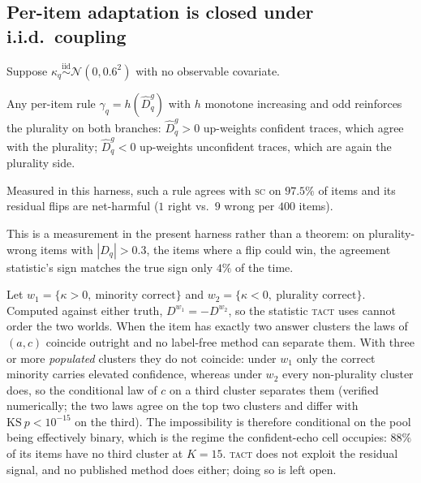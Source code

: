 \documentclass[twoside,11pt]{article}
\newcommand{\Dhat}{\widehat{D}}
\newcommand{\SC}{\textsc{sc}}
\newcommand{\TACT}{\textsc{tact}}
\begin{document}
\subsection{Per-item adaptation is closed under i.i.d.\ coupling}
Suppose $\kappa_q\stackrel{\text{iid}}{\sim}\mathcal{N}(0,0.6^2)$ with no observable covariate.

\begin{proposition}\label{prop:selfreinf}
Any per-item rule $\gamma_q=h(\Dhat^g_q)$ with $h$ monotone increasing and odd reinforces the plurality on both branches: $\Dhat^g_q>0$ up-weights confident traces, which agree with the plurality; $\Dhat^g_q<0$ up-weights unconfident traces, which are again the plurality side.
\end{proposition}
\begin{remark}
Measured in this harness, such a rule agrees with \SC{} on $97.5\%$ of items and its residual flips are net-harmful ($1$ right vs.\ $9$ wrong per $400$ items).
\end{remark}

\begin{remark}\label{prop:curse}
This is a measurement in the present harness rather than a theorem: on plurality-wrong items with $|D_q|>0.3$, the items where a flip could win, the agreement statistic's sign matches the true sign only $4\%$ of the time.
\end{remark}

\begin{proposition}\label{prop:twoworld}
Let $w_1=\{\kappa>0,\ \text{minority correct}\}$ and
$w_2=\{\kappa<0,\ \text{plurality correct}\}$. Computed against either truth,
$D^{w_1}=-D^{w_2}$, so the statistic \TACT{} uses cannot order the two worlds.
When the item has exactly two answer clusters the laws of $(a,c)$ coincide
outright and no label-free method can separate them. With three or more
\emph{populated} clusters they do not coincide: under $w_1$ only the correct
minority carries elevated confidence, whereas under $w_2$ every non-plurality
cluster does, so the conditional law of $c$ on a third cluster separates them
(verified numerically; the two laws agree on the top two clusters and differ
with $\mathrm{KS}\ p<10^{-15}$ on the third). The impossibility is therefore
conditional on the pool being effectively binary, which is the regime the
confident-echo cell occupies: $88\%$ of its items have no third cluster at
$K{=}15$. \TACT{} does not exploit the residual signal, and no published
method does either; doing so is left open.
\end{proposition}
\end{document}
